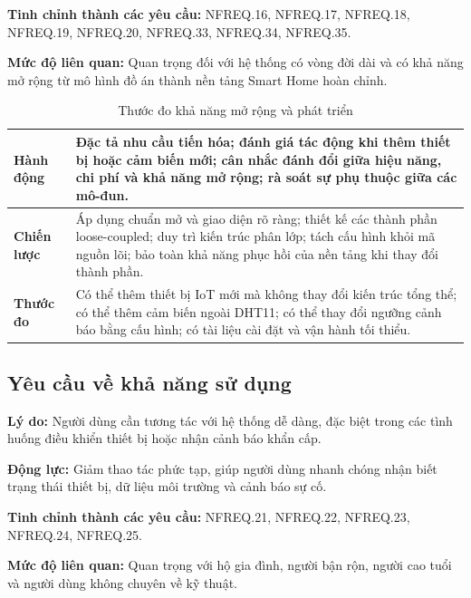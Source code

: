 \documentclass[a4paper,12pt]{article}
\begin{document}
\textbf{Tinh chỉnh thành các yêu cầu:} NFREQ.16, NFREQ.17, NFREQ.18, NFREQ.19, NFREQ.20, NFREQ.33, NFREQ.34, NFREQ.35.

\textbf{Mức độ liên quan:} Quan trọng đối với hệ thống có vòng đời dài và có khả năng mở rộng từ mô hình đồ án thành nền tảng Smart Home hoàn chỉnh.

\begin{table}[H]
\centering
\caption{Thước đo khả năng mở rộng và phát triển}
\small
\begin{tabularx}{\linewidth}{|p{3cm}|X|}
\hline
\textbf{Hành động} & Đặc tả nhu cầu tiến hóa; đánh giá tác động khi thêm thiết bị hoặc cảm biến mới; cân nhắc đánh đổi giữa hiệu năng, chi phí và khả năng mở rộng; rà soát sự phụ thuộc giữa các mô-đun. \\
\hline
\textbf{Chiến lược} & Áp dụng chuẩn mở và giao diện rõ ràng; thiết kế các thành phần loose-coupled; duy trì kiến trúc phân lớp; tách cấu hình khỏi mã nguồn lõi; bảo toàn khả năng phục hồi của nền tảng khi thay đổi thành phần. \\
\hline
\textbf{Thước đo} & Có thể thêm thiết bị IoT mới mà không thay đổi kiến trúc tổng thể; có thể thêm cảm biến ngoài DHT11; có thể thay đổi ngưỡng cảnh báo bằng cấu hình; có tài liệu cài đặt và vận hành tối thiểu. \\
\hline
\end{tabularx}
\end{table}

\subsection{Yêu cầu về khả năng sử dụng}

\textbf{Lý do:} Người dùng cần tương tác với hệ thống dễ dàng, đặc biệt trong các tình huống điều khiển thiết bị hoặc nhận cảnh báo khẩn cấp.

\textbf{Động lực:} Giảm thao tác phức tạp, giúp người dùng nhanh chóng nhận biết trạng thái thiết bị, dữ liệu môi trường và cảnh báo sự cố.

\textbf{Tinh chỉnh thành các yêu cầu:} NFREQ.21, NFREQ.22, NFREQ.23, NFREQ.24, NFREQ.25.

\textbf{Mức độ liên quan:} Quan trọng với hộ gia đình, người bận rộn, người cao tuổi và người dùng không chuyên về kỹ thuật.
\end{document}
